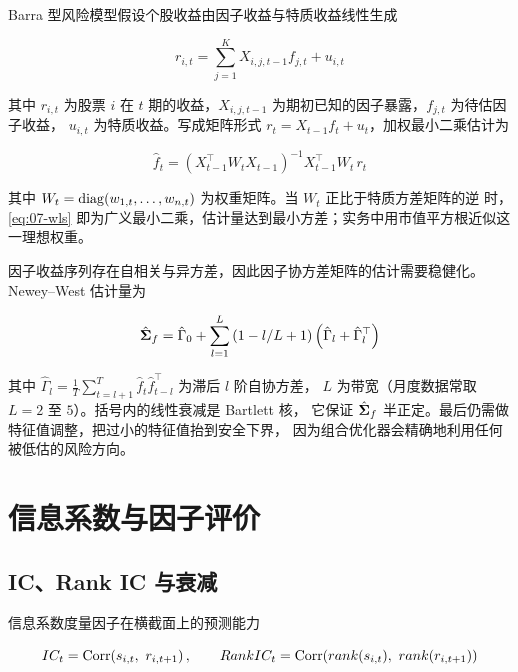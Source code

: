 Barra 型风险模型假设个股收益由因子收益与特质收益线性生成

\begin{equation}
  r_{i,t} = \sum_{j=1}^{K} X_{i,j,t-1} f_{j,t} + u_{i,t}
  \label{eq:07-riskmodel}
\end{equation}

其中 $r_{i,t}$ 为股票 $i$ 在 $t$ 期的收益，$X_{i,j,t-1}$ 为期初已知的因子暴露，$f_{j,t}$ 为待估因子收益，
$u_{i,t}$ 为特质收益。写成矩阵形式 $r_t = X_{t-1} f_t + u_t$，加权最小二乘估计为

\begin{equation}
  \hat{f}_t = \left(X_{t-1}^{\top} W_t X_{t-1}\right)^{-1} X_{t-1}^{\top} W_t\, r_t
  \label{eq:07-wls}
\end{equation}

其中 $W_t = \operatorname{diag}(w_{1,t},\dots,w_{n,t})$ 为权重矩阵。当 $W_t$ 正比于特质方差矩阵的逆
时，\cref{eq:07-wls} 即为广义最小二乘，估计量达到最小方差；实务中用市值平方根近似这一理想权重。

因子收益序列存在自相关与异方差，因此因子协方差矩阵的估计需要稳健化。Newey--West 估计量为

\begin{equation}
  \hat{\bm{\Sigma}}_f = \hat{\Gamma}_0 + \sum_{l=1}^{L} \left(1 - l/L+1\right)\left(\hat{\Gamma}_l + \hat{\Gamma}_l^{\top}\right)
  \label{eq:07-neweywest}
\end{equation}

其中 $\hat{\Gamma}_l = \frac{1}{T}\sum_{t=l+1}^{T} \hat{f}_t \hat{f}_{t-l}^{\top}$ 为滞后 $l$ 阶自协方差，
$L$ 为带宽（月度数据常取 $L=2$ 至 $5$）。括号内的线性衰减是 Bartlett 核，
它保证 $\hat{\bm{\Sigma}}_f$ 半正定。最后仍需做特征值调整，把过小的特征值抬到安全下界，
因为组合优化器会精确地利用任何被低估的风险方向。

\section{信息系数与因子评价}

\subsection{IC、Rank IC 与衰减}

信息系数度量因子在横截面上的预测能力

\begin{equation}
  IC_t = \Corr\!\left(s_{i,t},\ r_{i,t+1}\right), \qquad
  RankIC_t = \Corr\!\left(\mathrm{rank}(s_{i,t}),\ \mathrm{rank}(r_{i,t+1})\right)
  \label{eq:07-ic}
\end{equation}

